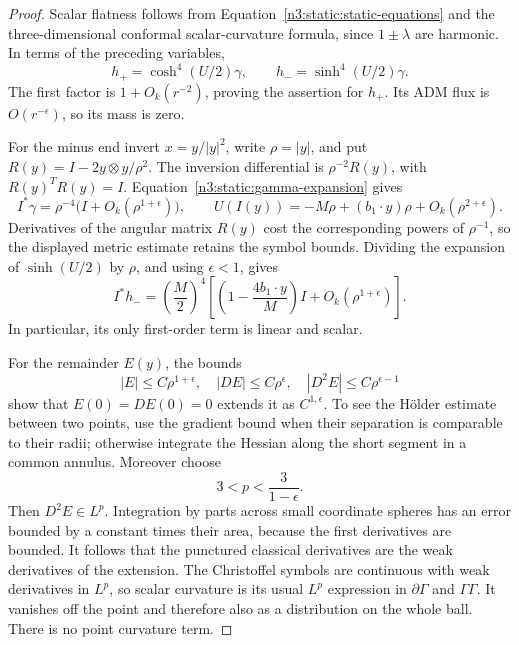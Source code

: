 \begin{proof}
Scalar flatness follows from
Equation~\eqref{n3:static:static-equations} and the three-dimensional
conformal scalar-curvature formula, since \(1\pm\lambda\) are harmonic.
In terms of the preceding variables,
\begin{equation}
\label{n3:static:conformal-gamma}
h_+=\cosh^4(U/2)\gamma,\qquad
h_-=\sinh^4(U/2)\gamma.
\end{equation}
The first factor is \(1+O_k(r^{-2})\), proving the assertion for
\(h_+\). Its ADM flux is \(O(r^{-\epsilon})\), so its mass is zero.

For the minus end invert \(x=y/|y|^2\), write \(\rho=|y|\), and
put \(R(y)=I-2y\otimes y/\rho^2\).
The inversion differential is \(\rho^{-2}R(y)\), with
\(R(y)^TR(y)=I\).
Equation~\eqref{n3:static:gamma-expansion} gives
\[
I^*\gamma=\rho^{-4}
\bigl(I+O_k(\rho^{1+\epsilon})\bigr),
\qquad
U(I(y))=-M\rho+(b_1\cdot y)\rho
 +O_k(\rho^{2+\epsilon}).
\]
Derivatives of the angular matrix \(R(y)\) cost the corresponding
powers of \(\rho^{-1}\), so the displayed metric estimate retains
the symbol bounds. Dividing the expansion of \(\sinh(U/2)\) by
\(\rho\), and using \(\epsilon<1\), gives
\begin{equation}
\label{n3:static:inverted-minus}
I^*h_-=\left(\frac M2\right)^4
\left[
\left(1-\frac{4b_1\cdot y}{M}\right)I
 +O_k(\rho^{1+\epsilon})
\right].
\end{equation}
In particular, its only first-order term is linear and scalar.

For the remainder \(E(y)\), the bounds
\[
|E|\leq C\rho^{1+\epsilon},\quad
|DE|\leq C\rho^\epsilon,\quad
|D^2E|\leq C\rho^{\epsilon-1}
\]
show that \(E(0)=DE(0)=0\) extends it as \(C^{1,\epsilon}\).
To see the Hölder estimate between two points, use the gradient
bound when their separation is comparable to their radii; otherwise
integrate the Hessian along the short segment in a common annulus.
Moreover choose
\[
3<p<\frac3{1-\epsilon}.
\]
Then \(D^2E\in L^p\). Integration by parts across small coordinate
spheres has an error bounded by a constant times their area,
because the first derivatives are bounded.
It follows that the punctured classical derivatives are the weak
derivatives of the extension.
The Christoffel symbols are continuous with weak derivatives in
\(L^p\), so scalar curvature is its usual \(L^p\) expression
in \(\partial\Gamma\) and \(\Gamma\Gamma\).
It vanishes off the point and therefore also as a distribution on
the whole ball. There is no point curvature term.
\end{proof}

